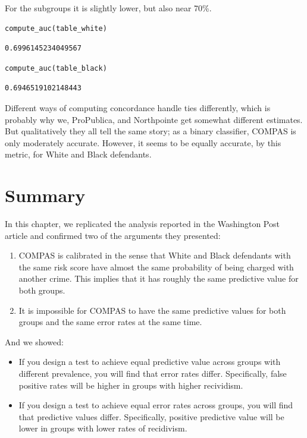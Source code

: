 For the subgroups it is slightly lower, but also near 70\%.

\begin{lstlisting}[language=Python,style=source]
compute_auc(table_white)
\end{lstlisting}

\begin{lstlisting}[style=output]
0.6996145234049567
\end{lstlisting}

\begin{lstlisting}[language=Python,style=source]
compute_auc(table_black)
\end{lstlisting}

\begin{lstlisting}[style=output]
0.6946519102148443
\end{lstlisting}

Different ways of computing concordance handle ties differently, which
is probably why we, ProPublica, and Northpointe get somewhat different
estimates. But qualitatively they all tell the same story; as a binary
classifier, COMPAS is only moderately accurate. However, it seems to be
equally accurate, by this metric, for White and Black defendants.

\section{Summary}\label{summary}

In this chapter, we replicated the analysis reported in the Washington
Post article and confirmed two of the arguments they presented:

\begin{enumerate}
\def\labelenumi{\arabic{enumi}.}
\item
  COMPAS is calibrated in the sense that White and Black defendants with
  the same risk score have almost the same probability of being charged
  with another crime. This implies that it has roughly the same
  predictive value for both groups.
\item
  It is impossible for COMPAS to have the same predictive values for
  both groups and the same error rates at the same time.
\end{enumerate}

And we showed:

\begin{itemize}
\item
  If you design a test to achieve equal predictive value across groups
  with different prevalence, you will find that error rates differ.
  Specifically, false positive rates will be higher in groups with
  higher recividism.
\item
  If you design a test to achieve equal error rates across groups, you
  will find that predictive values differ. Specifically, positive
  predictive value will be lower in groups with lower rates of
  recidivism.
\end{itemize}

